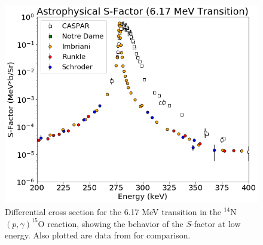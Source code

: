 \begin{figure}
		\includegraphics[width=1.0\linewidth]{figures/low617.png}
	\caption{Differential cross section for the 6.17 MeV transition in the $^{14}$N$\left( p,\gamma \right) ^{15}$O reaction, showing the behavior of the $S$-factor at low energy. Also plotted are data from \cite{Schroder1987, Imbriani2005, Runkle2005, Li2016} for comparison. }
	\label{fig: low617}
\end{figure}

%
% 
% 
